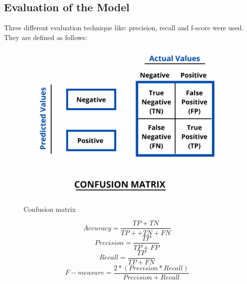 \documentclass[12pt]{report}
\begin{document}
        \subsection{Evaluation of the Model}
        Three different evaluation technique like: precision, recall and f-score were used.
        They are defined as follows:
        \begin{figure}[h]
            \centering
            \includegraphics[scale=0.4]{confusion_matrix.png}
            \caption{Confusion matrix}
        \end{figure}
            \begin{center}
                \begin{equation}
                    Accuracy = \frac{TP + TN }{TP +  + TN + FN}
                \end{equation}
                \begin{equation}
                    Precision = \frac{TP}{TP + FP}
                \end{equation}
                \begin{equation}
                    Recall= \frac{TP}{TP + FN}
                \end{equation}
                \begin{equation}
                    F-measure= \frac{2 * (Precision * Recall)}{Precision +  Recall}
                \end{equation}
            \end{center}
\end{document}
